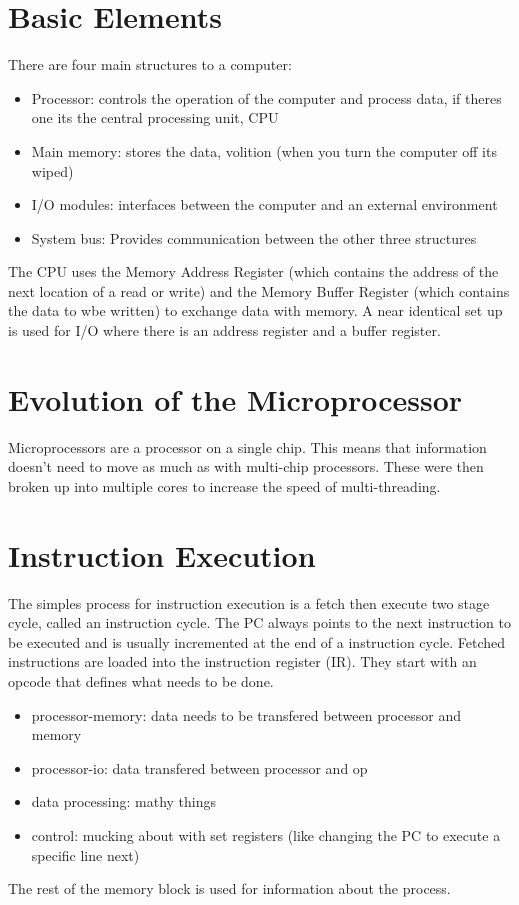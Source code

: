 \documentclass[12pt]{article}
\begin{document}

\section{Basic Elements}
There are four main structures to a computer:
\begin{itemize}
  \item Processor: controls the operation of the computer and process data, if theres one its the central processing unit, CPU
  \item Main memory: stores the data, volition (when you turn the computer off its wiped)
  \item I/O modules: interfaces between the computer and an external environment
  \item System bus: Provides communication between the other three structures
\end{itemize}
The CPU uses the Memory Address Register (which contains the address of the next location of a read or write) and the Memory Buffer Register (which contains the data to wbe written) to exchange data with memory. A near identical set up is used for I/O where there is an address register and a buffer register.

\section{Evolution of the Microprocessor}
Microprocessors are a processor on a single chip. This means that information doesn't need to move as much as with multi-chip processors. These were then broken up into multiple cores to increase the speed of multi-threading.

\section{Instruction Execution}
The simples process for instruction execution is a fetch then execute two stage cycle, called an instruction cycle. The PC always points to the next instruction to be executed and is usually incremented at the end of a instruction cycle. Fetched instructions are loaded into the instruction register (IR). They start with an opcode that defines what needs to be done.
\begin{itemize}
  \item processor-memory: data needs to be transfered between processor and memory
  \item processor-io: data transfered between processor and op
  \item data processing: mathy things
  \item control: mucking about with set registers (like changing the PC to execute a specific line next)
\end{itemize}
The rest of the memory block is used for information about the process.
\end{document}
